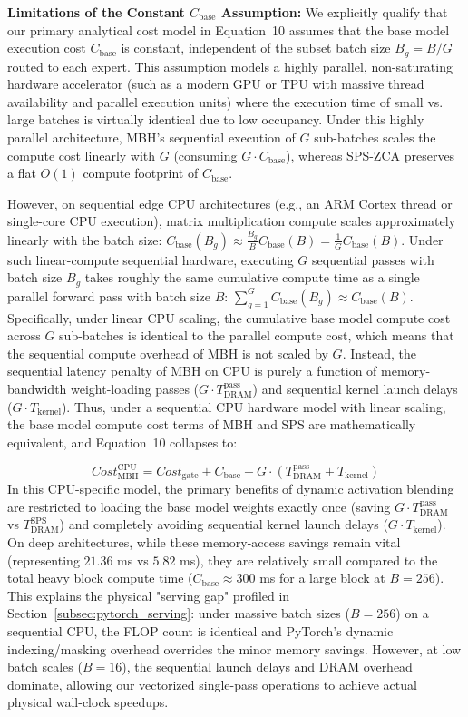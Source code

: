 \textbf{Limitations of the Constant $C_{\text{base}}$ Assumption:} 
We explicitly qualify that our primary analytical cost model in Equation~10 assumes that the base model execution cost $C_{\text{base}}$ is constant, independent of the subset batch size $B_g = B / G$ routed to each expert.
This assumption models a highly parallel, non-saturating hardware accelerator (such as a modern GPU or TPU with massive thread availability and parallel execution units) where the execution time of small vs.
large batches is virtually identical due to low occupancy. Under this highly parallel architecture, MBH's sequential execution of $G$ sub-batches scales the compute cost linearly with $G$ (consuming $G \cdot C_{\text{base}}$), whereas SPS-ZCA preserves a flat $O(1)$ compute footprint of $C_{\text{base}}$.

However, on sequential edge CPU architectures (e.g., an ARM Cortex thread or single-core CPU execution), matrix multiplication compute scales approximately linearly with the batch size: $C_{\text{base}}(B_g) \approx \frac{B_g}{B} C_{\text{base}}(B) = \frac{1}{G} C_{\text{base}}(B)$.
Under such linear-compute sequential hardware, executing $G$ sequential passes with batch size $B_g$ takes roughly the same cumulative compute time as a single parallel forward pass with batch size $B$: $\sum_{g=1}^G C_{\text{base}}(B_g) \approx C_{\text{base}}(B)$. Specifically, under linear CPU scaling, the cumulative base model compute cost across $G$ sub-batches is identical to the parallel compute cost, which means that the sequential compute overhead of MBH is not scaled by $G$. Instead, the sequential latency penalty of MBH on CPU is purely a function of memory-bandwidth weight-loading passes ($G \cdot T_{\text{DRAM}}^{\text{pass}}$) and sequential kernel launch delays ($G \cdot T_{\text{kernel}}$). 
Thus, under a sequential CPU hardware model with linear scaling, the base model compute cost terms of MBH and SPS are mathematically equivalent, and Equation~10 collapses to:

\begin{equation}
    Cost_{\text{MBH}}^{\text{CPU}} = Cost_{\text{gate}} + C_{\text{base}} + G \cdot (T_{\text{DRAM}}^{\text{pass}} + T_{\text{kernel}})
\end{equation}
In this CPU-specific model, the primary benefits of dynamic activation blending are restricted to loading the base model weights exactly once (saving $G \cdot T_{\text{DRAM}}^{\text{pass}}$ vs $T_{\text{DRAM}}^{\text{SPS}}$) and completely avoiding sequential kernel launch delays ($G \cdot T_{\text{kernel}}$).
On deep architectures, while these memory-access savings remain vital (representing $21.36$ ms vs $5.82$ ms), they are relatively small compared to the total heavy block compute time ($C_{\text{base}} \approx 300$ ms for a large block at $B=256$).
This explains the physical "serving gap" profiled in Section~\ref{subsec:pytorch_serving}: under massive batch sizes ($B=256$) on a sequential CPU, the FLOP count is identical and PyTorch's dynamic indexing/masking overhead overrides the minor memory savings.
However, at low batch scales ($B=16$), the sequential launch delays and DRAM overhead dominate, allowing our vectorized single-pass operations to achieve actual physical wall-clock speedups.


